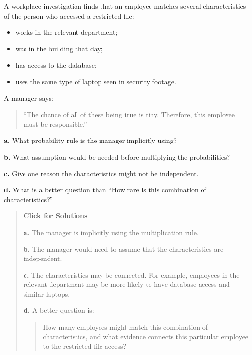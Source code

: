 \documentclass[
  letterpaper,
  DIV=11,
  numbers=noendperiod]{scrreprt}
\providecommand{\tightlist}{%
  \setlength{\itemsep}{0pt}\setlength{\parskip}{0pt}}
\begin{document}
\begin{tcolorbox}[enhanced jigsaw, arc=.35mm, bottomrule=.15mm, bottomtitle=1mm, breakable, colback=white, colbacktitle=quarto-callout-note-color!10!white, colframe=quarto-callout-note-color-frame, coltitle=black, left=2mm, leftrule=.75mm, opacityback=0, opacitybacktitle=0.6, rightrule=.15mm, title=\textcolor{quarto-callout-note-color}{\faInfo}\hspace{0.5em}{Question 15}, titlerule=0mm, toprule=.15mm, toptitle=1mm]

A workplace investigation finds that an employee matches several
characteristics of the person who accessed a restricted file:

\begin{itemize}
\tightlist
\item
  works in the relevant department;
\item
  was in the building that day;
\item
  has access to the database;
\item
  uses the same type of laptop seen in security footage.
\end{itemize}

A manager says:

\begin{quote}
``The chance of all of these being true is tiny. Therefore, this
employee must be responsible.''
\end{quote}

\textbf{a.} What probability rule is the manager implicitly using?

\textbf{b.} What assumption would be needed before multiplying the
probabilities?

\textbf{c.} Give one reason the characteristics might not be
independent.

\textbf{d.} What is a better question than ``How rare is this
combination of characteristics?''

\begin{quote}
\textbf{Click for Solutions}

\textbf{a.} The manager is implicitly using the multiplication rule.

\textbf{b.} The manager would need to assume that the characteristics
are independent.

\textbf{c.} The characteristics may be connected. For example, employees
in the relevant department may be more likely to have database access
and similar laptops.

\textbf{d.} A better question is:

\begin{quote}
How many employees might match this combination of characteristics, and
what evidence connects this particular employee to the restricted file
access?
\end{quote}
\end{quote}

\end{tcolorbox}
\end{document}
